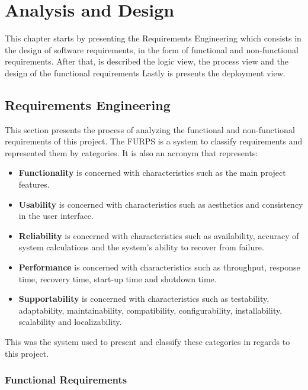 
\chapter{Analysis and Design} %
\label{chap:Chapter4}

This chapter starts by presenting the Requirements Engineering which consists in the design of software requirements, in the form of functional and non-functional requirements.
After that, is described the logic view, the process view and the design of the functional requirements
Lastly is presents the deployment view.

\section{Requirements Engineering}

This section presents the process of analyzing the functional and non-functional requirements of this project.
The FURPS\cite{eeles2005capturing} is a system to classify requirements and represented them by categories.
It is also an acronym that represents:

\begin{itemize}
    \item \textbf{Functionality} is concerned with characteristics such as the main project features.
    \item \textbf{Usability} is concerned with characteristics such as aesthetics and consistency in the user interface.
    \item \textbf{Reliability} is concerned with characteristics such as availability, accuracy of system calculations and the system's ability to recover from failure.
    \item \textbf{Performance} is concerned with characteristics such as throughput, response time, recovery time, start-up time and shutdown time.
    \item \textbf{Supportability} is concerned with characteristics such as testability, adaptability, maintainability, compatibility, configurability, installability, scalability and localizability.
\end{itemize}

This was the system used to present and classify these categories in regards to this project.

\subsection{Functional Requirements}

